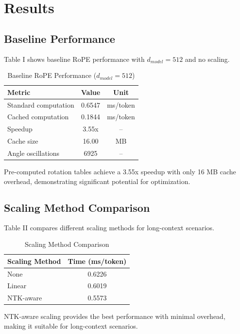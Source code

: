 \documentclass[conference]{IEEEtran}
\begin{document}
\section{Results}

\subsection{Baseline Performance}

Table I shows baseline RoPE performance with $d_{model}=512$ and no scaling.

\begin{table}[h]
\centering
\caption{Baseline RoPE Performance ($d_{model}=512$)}
\begin{tabular}{lcc}
\hline
\textbf{Metric} & \textbf{Value} & \textbf{Unit} \\
\hline
Standard computation & 0.6547 & ms/token \\
Cached computation & 0.1844 & ms/token \\
Speedup & 3.55x & -- \\
Cache size & 16.00 & MB \\
Angle oscillations & 6925 & -- \\
\hline
\end{tabular}
\end{table}

Pre-computed rotation tables achieve a 3.55x speedup with only 16 MB cache overhead, demonstrating significant potential for optimization.

\subsection{Scaling Method Comparison}

Table II compares different scaling methods for long-context scenarios.

\begin{table}[h]
\centering
\caption{Scaling Method Comparison}
\begin{tabular}{lc}
\hline
\textbf{Scaling Method} & \textbf{Time (ms/token)} \\
\hline
None & 0.6226 \\
Linear & 0.6019 \\
NTK-aware & 0.5573 \\
\hline
\end{tabular}
\end{table}

NTK-aware scaling provides the best performance with minimal overhead, making it suitable for long-context scenarios.
\end{document}

